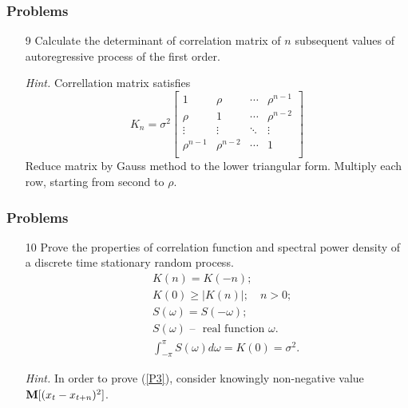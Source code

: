 \documentclass[14pt]{beamer}
\begin{document}
\begin{frame}
\frametitle{Problems}
\begin{enumerate}

    \item[9] \label{detkn} Calculate the determinant of correlation matrix of $n$ subsequent values of autoregressive process of the first order.
    
    \pause
    \emph{Hint.} Correllation matrix satisfies 
    \begin{equation}
    \label{ARN}
     K_n= \sigma^2 \left[
      \begin{array}{cccc}
        1 & \rho & \cdots & \rho^{n-1} \\
        \rho & 1 & \cdots & \rho^{n-2} \\
        \vdots & \vdots & \ddots & \vdots \\
        \rho^{n-1} & \rho^{n-2} & \cdots & 1 \\
      \end{array}
    \right]
    \end{equation}
    Reduce matrix by Gauss method to the lower triangular form. Multiply each row, starting from second to $\rho$.
\end{enumerate}
\end{frame}


\begin{frame}
\frametitle{Problems}
\begin{enumerate}

    \item[10] \label{KK} Prove the properties of correlation function and spectral power density of a discrete time stationary random process.
    \begin{eqnarray}
    &&  K(n) = K(-n);\\
    &&  K(0) \ge \left| K(n) \right|;\quad n>0;\label{P3}\\
    &&  S(\omega)= S(-\omega); \\
    &&  S(\omega)\mbox{ -- } \mbox{ real function } \omega.\\
    &&  \int_{-\pi}^{\pi}S(\omega)d\omega=K(0)=\sigma^2.
    \end{eqnarray}
    
    \pause
    \emph{Hint.} In order to prove (\ref{P3}), consider knowingly non-negative value ${\rm \bf M} [ (x_t - x_{t+n})^2 ]$.


\end{enumerate}
\end{frame}
\end{document}
